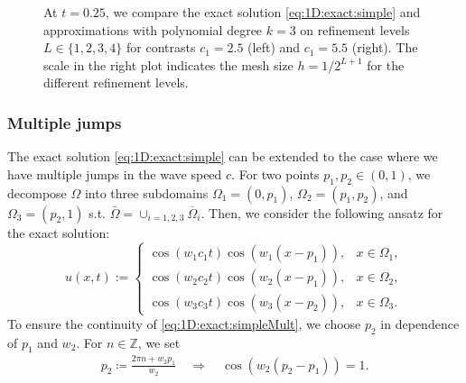\documentclass[sn-mathphys-num]{sn-jnl}
\numberwithin{equation}{section}
\begin{document}
\begin{figure}[!htbp]
\begin{center}
    \end{center}
    \caption{At $t = 0.25$, we compare the exact solution \eqref{eq:1D:exact:simple} and approximations with polynomial degree $k = 3$ on refinement levels $L \in \{1,2,3,4 \}$ for contrasts $c_1 = 2.5$ (left) and $c_1= 5.5$ (right). The scale in the right plot indicates the mesh size $h = 1/2^{L+1}$ for the different refinement levels.}
    \label{fig:jumpCoefs:quality}
  \end{figure}


\subsubsection{Multiple jumps}
 The exact solution \eqref{eq:1D:exact:simple} can be extended to the case where we have multiple jumps in the wave speed $c$. For two points $p_1,p_2 \in (0,1)$, we decompose $\Omega$ into three subdomains $\Omega_1 = (0,p_1)$, $\Omega_2 = (p_1,p_2)$, and $\Omega_3 = (p_2,1)$ s.t. $\bar{\Omega} = \cup_{i = 1,2,3} \overline{\Omega}_i$. Then, we consider the following ansatz for the exact solution: 
\begin{equation}\label{eq:1D:exact:simpleMult}
    u(x,t) := \begin{cases}
        \cos(w_1 c_1 t) \cos(w_1(x-p_1)), & x \in \Omega_1, \\
        \cos(w_2 c_2 t) \cos(w_2(x-p_1)), & x \in \Omega_2, \\
        \cos(w_3 c_3 t) \cos(w_3(x-p_2)), & x \in \Omega_3. 
    \end{cases}
\end{equation}
To ensure the continuity of \eqref{eq:1D:exact:simpleMult}, we choose $p_2$ in dependence of $p_1$ and $w_2$. For $n \in \mathbb{Z}$, we set
\begin{align*}
    p_2 \coloneqq \frac{2 \pi n + w_2 p_1}{w_2} \quad \Longrightarrow \quad \cos(w_2(p_2-p_1)) = 1.
\end{align*}
\end{document}
